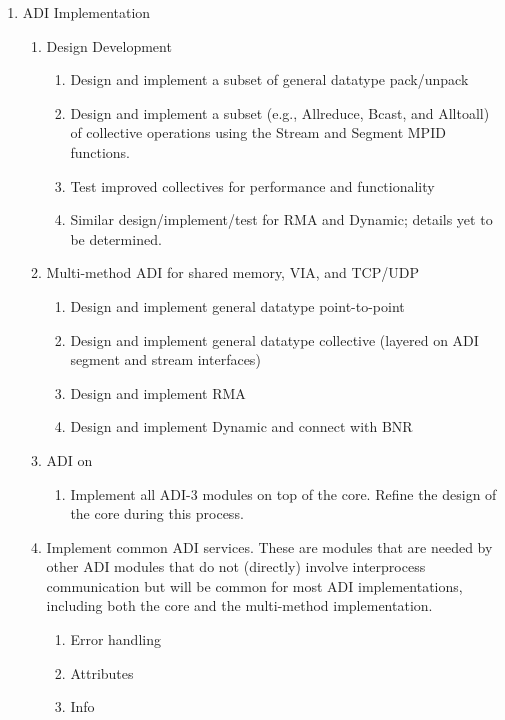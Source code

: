 \documentclass{article}
\begin{document}
\begin{enumerate}
\item ADI Implementation
    \begin{enumerate}
    \item Design Development
        \begin{enumerate}
        \item Design and implement a subset of general datatype pack/unpack
        \item Design and implement a subset (e.g., Allreduce, Bcast, and
          Alltoall) of collective operations using the Stream and Segment MPID
          functions.
        \item Test improved collectives for performance and functionality
        \item Similar design/implement/test for RMA and Dynamic; details yet
          to be determined.
        \end{enumerate}
    \item Multi-method ADI for shared memory, VIA, and TCP/UDP
        \begin{enumerate}
        \item Design and implement general datatype point-to-point
        \item Design and implement general datatype collective
        (layered on ADI segment and stream interfaces)
        \item Design and implement RMA
        \item Design and implement Dynamic and connect with BNR
        \end{enumerate}
    \item ADI on 
        \begin{enumerate}
        \item Implement all ADI-3 modules on top of the core.  Refine
        the design of the core during this process.   
        \end{enumerate}
    \item Implement common ADI services.  These are modules that are
    needed by other ADI modules that do not (directly) involve
    interprocess communication but will be common for most ADI
    implementations, including both the core and the multi-method
    implementation. 
        \begin{enumerate}
        \item Error handling
        \item Attributes
        \item Info

\end{enumerate}
\end{enumerate}
\end{enumerate}
\end{document}
